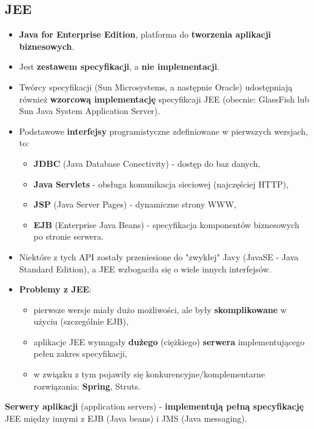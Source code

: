\documentclass[../main.tex]{subfiles}
\begin{document}
    \subsection{JEE}
    \begin{itemize}
        \item \textbf{Java for Enterprise Edition}, platforma do \textbf{tworzenia aplikacji biznesowych}.
        \item Jest \textbf{zestawem specyfikacji}, a \textbf{nie implementacji}.
        \item Twórcy specyfikacji (Sun Microsystems, a następnie Oracle) udostępniają również \textbf{wzorcową implementację} specyfikcaji JEE (obecnie: GlassFish lub Sun Java System Application Server).
        \item Podstawowe \textbf{interfejsy} programistyczne zdefiniowane w pierwszych wersjach, to:
        \begin{itemize}
            \item \textbf{JDBC} (Java Database Conectivity) - dostęp do baz danych,
            \item \textbf{Java Servlets} - obsługa komunikacja sieciowej (najczęściej HTTP),
            \item \textbf{JSP} (Java Server Pages) - dynamiczne strony WWW,
            \item \textbf{EJB} (Enterprise Java Beans) - specyfikacja komponentów biznesowych po stronie serwera.
        \end{itemize}
        \item Niektóre z tych API zostały przeniesione do "zwykłej" Javy (JavaSE - Java Standard Edition), a JEE wzbogaciła się o wiele innych interfejsów.
        \item \textbf{Problemy z JEE}:
        \begin{itemize}
            \item pierwsze wersje miały dużo możliwości, ale były \textbf{skomplikowane} w użyciu (szczególnie EJB),
            \item aplikacje JEE wymagały \textbf{dużego} (ciężkiego) \textbf{serwera} implementującego pełen zakres specyfikacji,
            \item w związku z tym pojawiły się konkurencyjne/komplementarne rozwiązania: \textbf{Spring}, Struts.
        \end{itemize}
    \end{itemize}

    \textbf{Serwery aplikacji} (application servers) - \textbf{implementują pełną specyfikację} JEE między innymi z EJB (Java beans) i
    JMS (Java messaging).
\end{document}
